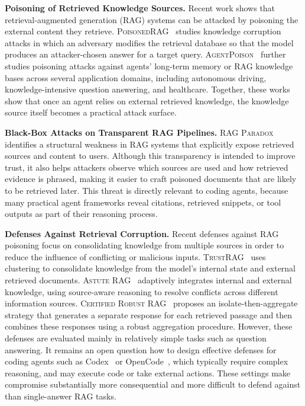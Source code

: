 \noindent \textbf{Poisoning of Retrieved Knowledge Sources.}
Recent work shows that retrieval-augmented generation (RAG) systems
can be attacked by poisoning the external content they retrieve.
\textsc{PoisonedRAG}~\cite{zou2025poisonedrag} studies knowledge corruption attacks
in which an adversary modifies the retrieval database so that the model produces
an attacker-chosen answer for a target query.
\textsc{AgentPoison}~\cite{chen2024agentpoison} further studies poisoning attacks
against agents' long-term memory or RAG knowledge bases across several application domains,
including autonomous driving, knowledge-intensive question answering, and healthcare.
Together, these works show that once an agent relies on external retrieved knowledge,
the knowledge source itself becomes a practical attack surface.

\noindent \textbf{Black-Box Attacks on Transparent RAG Pipelines.}
\textsc{RAG Paradox}~\cite{choi2025rag} identifies a structural
weakness in RAG systems that explicitly expose retrieved sources and content to users.
Although this transparency is intended to improve trust,
it also helps attackers observe which sources are used and how retrieved evidence is phrased,
making it easier to craft poisoned documents that are likely to be retrieved later.
This threat is directly relevant to coding agents,
because many practical agent frameworks reveal citations,
retrieved snippets, or tool outputs as part of their reasoning process.

\noindent \textbf{Defenses Against Retrieval Corruption.}
Recent defenses against RAG poisoning focus on consolidating knowledge
from multiple sources in order to reduce the influence of conflicting or malicious inputs.
\textsc{TrustRAG}~\cite{zhou2025trustrag} uses clustering to consolidate knowledge
from the model's internal state and external retrieved documents.
\textsc{Astute RAG}~\cite{wang2025astute} adaptively integrates internal and external knowledge,
using source-aware reasoning to resolve conflicts across different information sources.
\textsc{Certified Robust RAG}~\cite{xiang2024certifiably} proposes an isolate-then-aggregate strategy
that generates a separate response for each retrieved passage and then combines these
responses using a robust aggregation procedure.
However, these defenses are evaluated mainly in relatively simple tasks such as 
question answering.
It remains an open question how to design effective defenses for coding agents such as 
Codex~\cite{openai_codex_2026} or OpenCode~\cite{opencode_2026},
which typically require complex reasoning, 
and may execute code or take external actions.
These settings make compromise substantially more consequential 
and more difficult to defend against
than single-answer RAG tasks.





